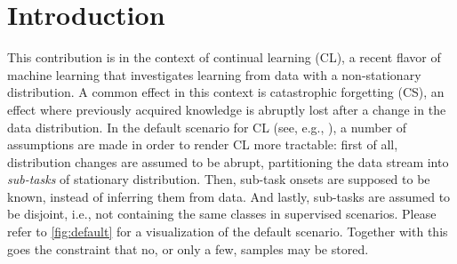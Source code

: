 \documentclass{article} %
\begin{document}
\section{Introduction}

%
This contribution is in the context of continual learning (CL), a recent flavor of machine learning that investigates learning from data with a non-stationary distribution.
A common effect in this context is catastrophic forgetting (CS), an effect where previously acquired knowledge is abruptly lost after a change in the data distribution. 
In the default scenario for CL (see, e.g., \cite{bagus22b}), a number of assumptions are made in order to render CL more tractable: first of all, distribution changes are assumed to be abrupt, partitioning the data stream into \textit{sub-tasks} of stationary distribution. Then, sub-task onsets are supposed to be known, instead of inferring them from data. And lastly, sub-tasks are assumed to be disjoint, i.e., not containing the same classes in supervised scenarios. Please refer to \cref{fig:default} for a visualization of the default scenario. Together with this goes the constraint that no, or only a few, samples may be stored.
%
\end{document}
